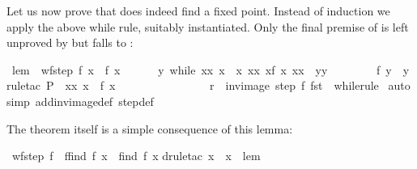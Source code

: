 \begin{isabellebody}
\begin{isamarkuptext}
Let us now prove that  does indeed find a fixed point. Instead
of induction we apply the above while rule, suitably instantiated.
Only the final premise of  is left unproved
by  but falls to :%
\end{isamarkuptext}%
\ lem{\isacharcolon}\ {\isachardoublequote}{\isasymlbrakk}\ wf{\isacharparenleft}step{}\ f{\isacharparenright}{\isacharsemicolon}\ x{\isacharprime}\ {\isacharequal}\ f\ x\ {\isasymrbrakk}\ {\isasymLongrightarrow}\ \isanewline
\ \ \ {\isasymexists}y{\isachardot}\ while\ {\isacharparenleft}{\isasymlambda}{\isacharparenleft}x{\isacharcomma}x{\isacharprime}{\isacharparenright}{\isachardot}\ x{\isacharprime}\ {\isasymnoteq}\ x{\isacharparenright}\ {\isacharparenleft}{\isasymlambda}{\isacharparenleft}x{\isacharcomma}x{\isacharprime}{\isacharparenright}{\isachardot}\ {\isacharparenleft}x{\isacharprime}{\isacharcomma}f\ x{\isacharprime}{\isacharparenright}{\isacharparenright}\ {\isacharparenleft}x{\isacharcomma}x{\isacharprime}{\isacharparenright}\ {\isacharequal}\ {\isacharparenleft}y{\isacharcomma}y{\isacharparenright}\ {\isasymand}\isanewline
\ \ \ \ \ \ \ f\ y\ {\isacharequal}\ y{\isachardoublequote}\isanewline
{}rule{\isacharunderscore}tac\ P\ {\isacharequal}\ {\isachardoublequote}{\isasymlambda}{\isacharparenleft}x{\isacharcomma}x{\isacharprime}{\isacharparenright}{\isachardot}\ x{\isacharprime}\ {\isacharequal}\ f\ x{\isachardoublequote}\ \isanewline
\ \ \ \ \ \ \ \ \ \ \ \ \ \ \ r\ {\isacharequal}\ {\isachardoublequote}inv{\isacharunderscore}image\ {\isacharparenleft}step{}\ f{\isacharparenright}\ fst{\isachardoublequote}\ \ while{\isacharunderscore}rule{\isacharparenright}\isanewline
{}\ auto\isanewline
{}simp\ add{\isacharcolon}inv{\isacharunderscore}image{\isacharunderscore}def\ step{}{\isacharunderscore}def{\isacharparenright}\isanewline
{}%
\begin{isamarkuptext}%
The theorem itself is a simple consequence of this lemma:%
\end{isamarkuptext}%
\ {\isachardoublequote}wf{\isacharparenleft}step{}\ f{\isacharparenright}\ {\isasymLongrightarrow}\ f{\isacharparenleft}find{}\ f\ x{\isacharparenright}\ {\isacharequal}\ find{}\ f\ x{\isachardoublequote}\isanewline
{}drule{\isacharunderscore}tac\ x\ {\isacharequal}\ x\ \ lem{\isacharparenright}\isanewline

\end{isabellebody}
